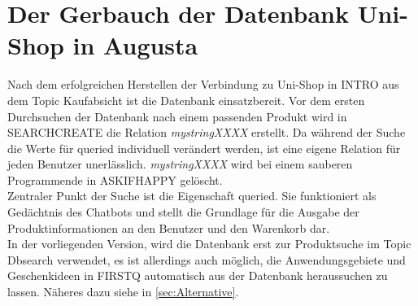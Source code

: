 \section{Der Gerbauch der Datenbank Uni-Shop in Augusta}
\label{sec:SQL}
Nach dem erfolgreichen Herstellen der Verbindung zu Uni-Shop in INTRO aus dem Topic Kaufabsicht ist die Datenbank einsatzbereit.
Vor dem ersten Durchsuchen der Datenbank nach einem passenden Produkt wird in SEARCHCREATE die Relation \textit{mystringXXXX} erstellt. Da während der Suche die Werte für queried individuell verändert werden, ist eine eigene Relation für jeden Benutzer unerlässlich. \textit{mystringXXXX} wird bei einem sauberen Programmende in ASKIFHAPPY gelöscht.\\
Zentraler Punkt  der Suche ist die Eigenschaft queried. Sie funktioniert als Gedächtnis des Chatbots und stellt die Grundlage für die Ausgabe der Produktinformationen an den Benutzer und den Warenkorb dar.\\
In der vorliegenden Version, wird die Datenbank erst zur Produktsuche im Topic Dbsearch verwendet, es ist allerdings auch möglich, die Anwendungsgebiete und Geschenkideen in FIRSTQ automatisch aus der Datenbank heraussuchen zu lassen. Näheres dazu siehe in \ref{sec:Alternative}.


